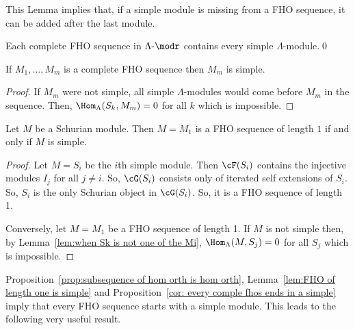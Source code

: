 This Lemma implies that, if a simple module is missing from a FHO sequence, it can be added after the last module.

\begin{prop}
Each complete FHO sequence in $\Lambda\text{-}\modr $ contains every simple $\Lambda$-module.\qed
\end{prop}

\begin{coro}\label{cor: every comple fhos ends in a simple}
If $M_1,\ldots,M_m$ is a complete FHO sequence then $M_m$ is simple.
\end{coro}

\begin{proof}
If $M_m$ were not simple, all simple $\Lambda$-modules would come before $M_m$ in the sequence. Then, $\Hom_\Lambda(S_k,M_m)=0$ for all $k$ which is impossible.
\end{proof}


\begin{lemm}\label{lem:FHO of length one is simple}
Let $M$ be a Schurian module. Then $M=M_1$ is a FHO sequence of length $1$ if and only if $M$ is simple.
\end{lemm}

\begin{proof}
Let $M=S_i$ be the $i$th simple module. Then $\cF(S_i)$ contains the injective modules $I_j$ for all $j\neq i$. So, $\cG(S_i)$ consists only of iterated self extensions of $S_i$. So, $S_i$ is the only Schurian object in $\cG(S_i)$. So, it is a FHO sequence of length 1.

Conversely, let $M=M_1$ be a FHO sequence of length 1. If $M$ is not simple then, by Lemma~\ref{lem:when Sk is not one of the Mi}, $\Hom_\Lambda(M,S_j)=0$ for all $S_j$ which is impossible.%
\end{proof}

Proposition~\ref{prop:subsequence of hom orth is hom orth}, Lemma~\ref{lem:FHO of length one is simple} and Proposition~\ref{cor: every comple fhos ends in a simple} imply that every FHO sequence starts with a simple module. This leads to the following very useful result.

